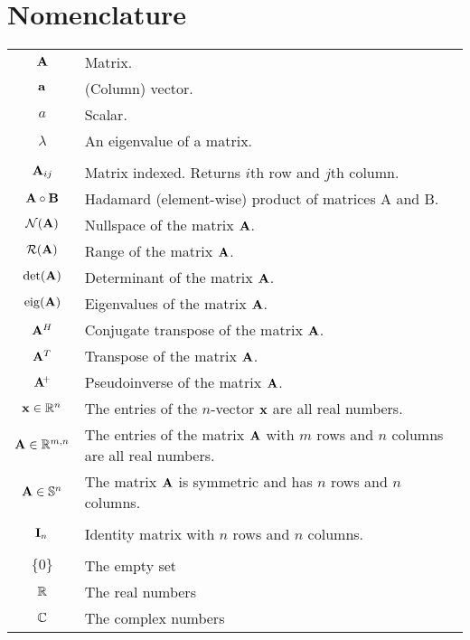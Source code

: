 \chapter{Nomenclature}

\begin{tabular}{cl}
$\mathbf{A}$                   & Matrix.                                                   \\
$\mathbf{a}$                   & (Column) vector.                                          \\
$a$                     & Scalar.                                                   \\
$\lambda$               & An eigenvalue of a matrix.                                \\
& \\
$\mathbf{A}_{ij}$              & Matrix indexed. Returns $i$th row and $j$th column.       \\
$\mathbf{A}\circ \mathbf{B}$          & Hadamard (element-wise) product of matrices A and B.      \\
$\mathcal{N}(\mathbf{A})$              & Nullspace of the matrix $\mathbf{A}$.                            \\
$\mathcal{R}(\mathbf{A})$           & Range of the matrix $\mathbf{A}$.                                \\
$\det(\mathbf{A})$             & Determinant of the matrix $\mathbf{A}$.                          \\
$\operatorname{eig}(\mathbf{A})$             & Eigenvalues of the matrix $\mathbf{A}$.                          \\
$\mathbf{A}^H$                 & Conjugate transpose of the matrix $\mathbf{A}$.                  \\
$\mathbf{A}^T$                 & Transpose of the matrix $\mathbf{A}$.                            \\
$\mathbf{A}\!^+$              & Pseudoinverse of the matrix $\mathbf{A}$.                        \\
$\mathbf{x}\in\mathbb{R}^{n}$            & The entries of the $n$-vector $\mathbf{x}$ are all real numbers. \\
$\mathbf{A}\in\mathbb{R}^{m,n}$           & The entries of the matrix $\mathbf{A}$ with $m$ rows and $n$ columns are all real numbers. \\
$\mathbf{A}\in\mathbb{S}^{n}$            & The matrix $\mathbf{A}$ is symmetric and has $n$ rows and $n$ columns. \\
& \\
$\mathbf{I}_n$                 & Identity matrix with $n$ rows and $n$ columns.            \\
& \\
$\{0\}$                 & The empty set       \\
$\mathbb{R}$                   & The real numbers    \\
$\mathbb{C}$                   & The complex numbers
\end{tabular}